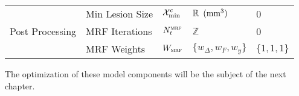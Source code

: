 \begin{table}
\begin{tabular}{lllll}
  	\multirow{3}{*}{Post Processing}             & Min Lesion  Size & $\mathcal{X}_{\min}^{c}$             & $\mathbb{R}\enspace(\text{mm}^{3})$                       & 0                         \\
  	                                             & MRF Iterations   & $N_{t}^{\textsc{mrf}}$              & $\mathbb{Z}$                                  & 0                         \\
  	                                             & MRF Weights      & $W_{\textsc{mrf}}$                  & $\{w_{\Delta},w_{F},w_y\}$                    & $\{1,1,1\}$               \\ \hline
  \end{tabular}
\end{table}

The optimization of these model components will be the subject of the next chapter. 
